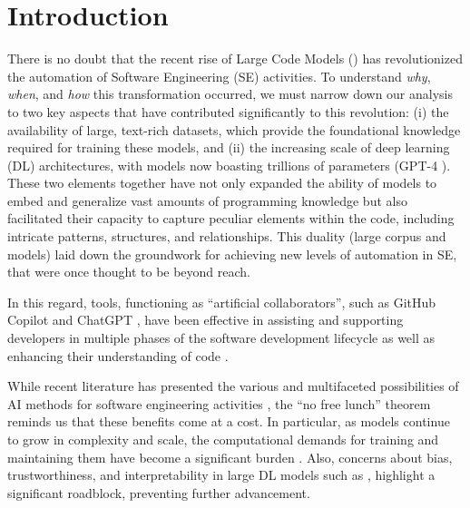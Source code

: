 \section{Introduction}
\label{sec:introduction}
There is no doubt that the recent rise of Large Code Models (\lcms) has revolutionized the automation of Software Engineering (SE) activities. 
To understand \emph{why}, \emph{when}, and \emph{how} this transformation occurred, we must narrow down our analysis to two key aspects that have contributed significantly to this revolution: (i) the availability of large, text-rich datasets, which provide the foundational knowledge required for training these models, and (ii) the increasing scale of deep learning (DL) architectures, with models now boasting trillions of parameters (\eg GPT-4 \cite{openai2024gpt4}). These two elements together have not only expanded the ability of models to embed and generalize vast amounts of programming knowledge but also facilitated their capacity to capture peculiar elements within the code, including intricate patterns, structures, and relationships. This duality (\ie large corpus and models) laid down the groundwork for achieving new levels of automation in SE, that were once thought to be beyond reach.


In this regard, tools, functioning as ``artificial collaborators'', such as GitHub Copilot \cite{copilot} and ChatGPT \cite{chatgpt}, have been effective in assisting and supporting developers in multiple phases of the software development lifecycle \cite{white2023chatgpt,nashid2023retrieval,watanabe2024use} as well as enhancing their understanding of code \cite{khojah2024beyond,dakhel2023github}.

While recent literature has presented the various and multifaceted possibilities of AI methods for software engineering activities \cite{hou2023large}, the ``no free lunch'' theorem reminds us that these benefits come at a cost. In particular, as models continue to grow in complexity and scale, the computational demands for training and maintaining them have become a significant burden \cite{stojkovic2024greener}. Also, concerns about bias, trustworthiness, and interpretability in large DL models such as \lcms, highlight a significant roadblock, preventing further advancement.


